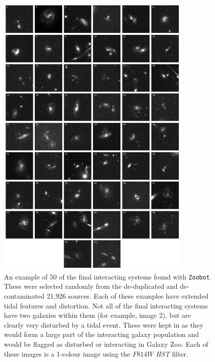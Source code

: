 {\begin{figure}
  \centering
  \includegraphics[width=0.85\textwidth]{Chapter2/figures/fig9.jpeg}
  \caption[An example of 50 of the final interacting systems found with \texttt{Zoobot}.]{An example of 50 of the final interacting systems found with \texttt{Zoobot}. These were selected randomly from the de-duplicated and de-contaminated 21,926 sources. Each of these examples have extended tidal features and distortion. Not all of the final interacting systems have two galaxies within them (for example, image 2), but are clearly very disturbed by a tidal event. These were kept in as they would form a large part of the interacting galaxy population and would be flagged as disturbed or interacting in Galaxy Zoo. Each of these images is a 1-colour image using the $F814W$ \emph{HST} filter.}
  \label{fig:interactors}
\end{figure}

}
